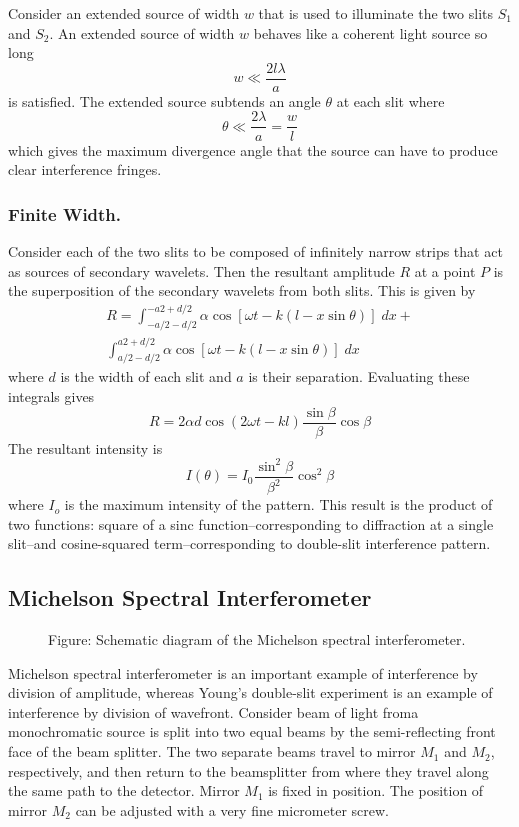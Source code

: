 \documentclass[../../../main.tex]{subfiles}
\begin{document}
Consider an extended source of width $w$ that is used to illuminate the two slits $S_1$ and $S_2$.  An extended source of width $w$ behaves like a coherent light source so long
\begin{equation*}
    w\ll \frac{2l\lambda}{a}
\end{equation*}
is satisfied. The extended source subtends an angle $\theta$ at each slit where
\begin{equation*}
    \theta\ll \frac{2\lambda}{a}=\frac{w}{l}
\end{equation*}
which gives the maximum divergence angle that the source can have to produce clear interference fringes.

\subsubsection{Finite Width.} Consider each of the two slits to be composed of infinitely narrow strips that act as sources of secondary wavelets. Then the resultant amplitude $R$ at a point $P$ is the superposition of the secondary wavelets from both slits. This is given by
\begin{multline*}
    R=\int_{-a/2-d/2}^{-a2+d/2}\alpha \cos[\omega t- k(l-x\sin \theta)]\;dx+\\ \int_{a/2-d/2}^{a2+d/2}\alpha \cos[\omega t- k(l-x\sin \theta)]\;dx
\end{multline*}
where $d$ is the width of each slit and $a$ is their separation. Evaluating these integrals gives
\begin{equation*}
    R=2\alpha d \cos(2\omega t - kl)\frac{\sin \beta}{\beta}\cos \beta
\end{equation*}
The resultant intensity is
\begin{equation*}
    I(\theta)=I_0\frac{\sin^2 \beta}{\beta^2}\cos^2 \beta
\end{equation*}
where $I_o$ is the maximum intensity of the pattern. This result is the product of two functions: square of a sinc function--corresponding to diffraction at a single slit--and cosine-squared term--corresponding to double-slit interference pattern.

\subsection{Michelson Spectral Interferometer}
\begin{figure}
    \centering
    \caption*{Figure: Schematic diagram of the Michelson spectral interferometer.}
\end{figure}
Michelson spectral interferometer is an important example of interference by division of amplitude, whereas Young's double-slit experiment is an example of interference by division of wavefront. Consider beam of light froma monochromatic source is split into two equal beams by the semi-reﬂecting front face of the beam splitter. The two separate beams travel to mirror $M_1$ and $M_2$, respectively, and then return to the beamsplitter from where they travel along the same path to the detector. Mirror $M_1$ is ﬁxed in position. The position of mirror $M_2$ can be adjusted with a very ﬁne micrometer screw. 
\end{document}
